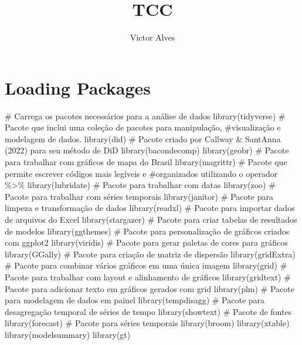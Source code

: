 \documentclass[
  letterpaper,
  DIV=11,
  numbers=noendperiod]{scrartcl}
\title{TCC}
\author{Victor Alves}
\date{}
\newenvironment{Shaded}{\begin{snugshade}}{\end{snugshade}}
\newcommand{\CommentTok}[1]{\textcolor[rgb]{0.37,0.37,0.37}{#1}}
\newcommand{\FunctionTok}[1]{\textcolor[rgb]{0.28,0.35,0.67}{#1}}
\newcommand{\NormalTok}[1]{\textcolor[rgb]{0.00,0.23,0.31}{#1}}
\begin{document}
\maketitle

\section{Loading Packages}\label{loading-packages}

\begin{Shaded}
\begin{Highlighting}[]
\CommentTok{\# Carrega os pacotes necessários para a análise de dados}
\FunctionTok{library}\NormalTok{(tidyverse)    }\CommentTok{\# Pacote que inclui uma coleção de pacotes para manipulação, }
\CommentTok{\#visualização e modelagem de dados.}
\FunctionTok{library}\NormalTok{(did) }\CommentTok{\# Pacote criado por Callway \& Sant\textquotesingle{}Anna (2022) para seu método de DiD}
\FunctionTok{library}\NormalTok{(bacondecomp)}
\FunctionTok{library}\NormalTok{(geobr) }\CommentTok{\# Pacote para trabalhar com gráficos de mapa do Brasil}
\FunctionTok{library}\NormalTok{(magrittr)     }\CommentTok{\# Pacote que permite escrever códigos mais legíveis e }
\CommentTok{\#organizados utilizando o operador \%\textgreater{}\%}
\FunctionTok{library}\NormalTok{(lubridate)    }\CommentTok{\# Pacote para trabalhar com datas}
\FunctionTok{library}\NormalTok{(zoo)          }\CommentTok{\# Pacote para trabalhar com séries temporais}
\FunctionTok{library}\NormalTok{(janitor)      }\CommentTok{\# Pacote para limpeza e transformação de dados}
\FunctionTok{library}\NormalTok{(readxl)       }\CommentTok{\# Pacote para importar dados de arquivos do Excel}
\FunctionTok{library}\NormalTok{(stargazer)    }\CommentTok{\# Pacote para criar tabelas de resultados de modelos}
\FunctionTok{library}\NormalTok{(ggthemes)     }\CommentTok{\# Pacote para personalização de gráficos criados com ggplot2}
\FunctionTok{library}\NormalTok{(viridis)      }\CommentTok{\# Pacote para gerar paletas de cores para gráficos}
\FunctionTok{library}\NormalTok{(GGally)       }\CommentTok{\# Pacote para criação de matriz de dispersão}
\FunctionTok{library}\NormalTok{(gridExtra)    }\CommentTok{\# Pacote para combinar vários gráficos em uma única imagem}
\FunctionTok{library}\NormalTok{(grid)         }\CommentTok{\# Pacote para trabalhar com layout e alinhamento de gráficos}
\FunctionTok{library}\NormalTok{(gridtext)     }\CommentTok{\# Pacote para adicionar texto em gráficos gerados com grid}
\FunctionTok{library}\NormalTok{(plm)          }\CommentTok{\# Pacote para modelagem de dados em painel}
\FunctionTok{library}\NormalTok{(tempdisagg)   }\CommentTok{\# Pacote para desagregação temporal de séries de tempo}
\FunctionTok{library}\NormalTok{(showtext)     }\CommentTok{\# Pacote de fontes}
\FunctionTok{library}\NormalTok{(forecast)     }\CommentTok{\# Pacote para séries temporais}
\FunctionTok{library}\NormalTok{(broom)}
\FunctionTok{library}\NormalTok{(xtable)}
\FunctionTok{library}\NormalTok{(modelsummary)}
\FunctionTok{library}\NormalTok{(gt)}
\end{Highlighting}
\end{Shaded}
\end{document}

